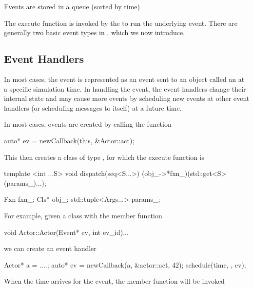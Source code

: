 Events are stored in a queue (sorted by time)

\begin{CppCode}
namespace sstmac {

class ExecutionEvent
{
 public:
  virtual void execute() = 0;

  ...
};
\end{CppCode}

The execute function is invoked by the \evmgr to run the underlying event.
There are generally two basic event types in \sstmacro, which we now introduce.

\subsection{Event Handlers}
\label{subsec:eventHandlers}
In most cases, the event is represented as an event sent to an object called an \evhandler at a specific simulation time.
In handling the event, the event handlers change their internal state and may cause more events
by scheduling new events at other event handlers (or scheduling messages to itself) at a future time.

In most cases, events are created by calling the function

\begin{CppCode}
auto* ev = newCallback(this, &Actor::act);
\end{CppCode}

This then creates a class of type , for which the execute function is

\begin{CppCode}
template <int ...S> void dispatch(seq<S...>){
  (obj_->*fxn_)(std::get<S>(params_)...);
}

Fxn fxn_;
Cls* obj_;
std::tuple<Args...> params_;
\end{CppCode}

For example, given a class  with the member function 

\begin{CppCode}
void Actor::Actor(Event* ev, int ev_id){...}
\end{CppCode}
we can create an event handler

\begin{CppCode}
Actor* a = ....;
auto* ev = newCallback(a, &actor::act, 42);
schedule(time, , ev);
\end{CppCode}
When the time arrives for the event, the member function will be invoked

